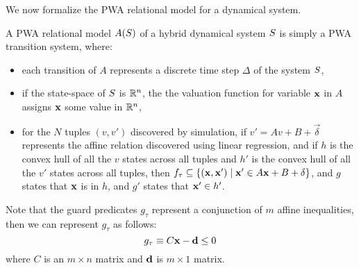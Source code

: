 We now formalize the PWA relational model for a dynamical system.
\begin{definition}

A PWA relational model $A(S)$ of a hybrid dynamical system
$S$ is simply a PWA transition system, where:

\begin{itemize}[noitemsep, leftmargin= 1.5 em]
\item
each transition of $A$ represents a discrete time step $\Delta$ of the
system $S$,
\item
if the state-space of $S$ is $\mathbb{R}^n$, the the valuation
function for variable $\mathbf{x}$ in $A$ assigns $\mathbf{x}$ some value in
$\mathbb{R}^n$,
\item
for the $N$ tuples $(v,v')$ discovered by simulation, if $v' = Av
+ B + \vec{\delta}$ represents the affine relation discovered using
linear regression, and if $h$ is the convex hull of all the $v$
states across all tuples and $h'$ is the convex hull of all the $v'$
states across all tuples, then $f_\tau \subseteq
\{(\mathbf{x},\mathbf{x}') \mid \mathbf{x}' \in A\mathbf{x} + B + \mathbf{\delta}\}$,
and $g$ states that $\mathbf{x}$ is in $h$, and $g'$ states that
$\mathbf{x}' \in h'$.
\end{itemize}

Note that the guard predicates $g_\tau$ represent a conjunction of $m$
affine inequalities, then we can represent $g_\tau$ as follows:
\[
g_\tau  \equiv C\mathbf{x} - \mathbf{d} \le 0
\]
where $C$ is an $m \times n$ matrix and $\mathbf{d}$ is $m \times 1$ matrix.


%
\end{definition}

